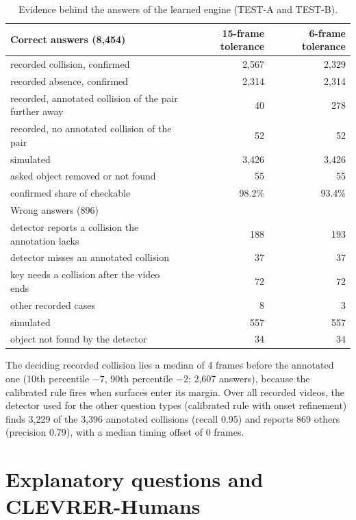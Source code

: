 \documentclass[10pt,onecolumn,letterpaper]{article}
\begin{document}
\begin{table}[h]
\caption{Evidence behind the answers of the learned engine (TEST-A and TEST-B).}
\label{tab:evidence}
\centering
\small
\begin{tabular}{@{}lrr@{}}
\toprule
Correct answers (8,454) & 15-frame tolerance & 6-frame tolerance \\
\midrule
recorded collision, confirmed & 2,567 & 2,329 \\
recorded absence, confirmed & 2,314 & 2,314 \\
recorded, annotated collision of the pair further away & 40 & 278 \\
recorded, no annotated collision of the pair & 52 & 52 \\
simulated & 3,426 & 3,426 \\
asked object removed or not found & 55 & 55 \\
\midrule
confirmed share of checkable & 98.2\% & 93.4\% \\
\midrule
Wrong answers (896) & & \\
\midrule
detector reports a collision the annotation lacks & 188 & 193 \\
detector misses an annotated collision & 37 & 37 \\
key needs a collision after the video ends & 72 & 72 \\
other recorded cases & 8 & 3 \\
simulated & 557 & 557 \\
object not found by the detector & 34 & 34 \\
\bottomrule
\end{tabular}
\end{table}

The deciding recorded collision lies a median of 4 frames before the annotated one (10th percentile $-7$, 90th percentile $-2$; 2,607 answers), because the calibrated rule fires when surfaces enter its margin.
Over all recorded videos, the detector used for the other question types (calibrated rule with onset refinement) finds 3,229 of the 3,396 annotated collisions (recall 0.95) and reports 869 others (precision 0.79), with a median timing offset of 0 frames.

\section{Explanatory questions and CLEVRER-Humans}
\label{app:explanatory}
\end{document}
